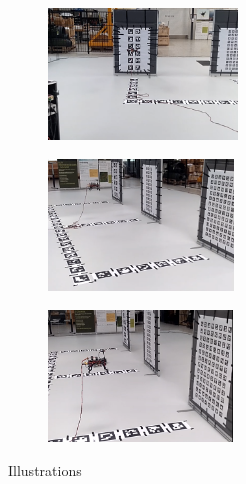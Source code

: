 \documentclass[../Head/report.tex]{subfiles}
\begin{document}
\begin{figure}[H]
    \centering
    \begin{subfigure}[t]{.31\textwidth}
        \centering
        \includegraphics[height=3.5cm]{../Figures/optitrack/hold_pose_using_estimated_aruco_pose_one.png}
        \caption{}
        \label{fig:optitrack_hold_pose_board_one}
    \end{subfigure}
    \begin{subfigure}[t]{.31\textwidth}
        \centering
        \includegraphics[height=3.5cm]{../Figures/optitrack/hold_pose_using_estimated_aruco_pose_two.png}
        \caption{}
        \label{fig:optitrack_hold_pose_board_two}
    \end{subfigure}
    \begin{subfigure}[t]{.31\textwidth}
        \centering
        \includegraphics[height=3.5cm]{../Figures/optitrack/hold_pose_using_estimated_aruco_pose_three.png}
        \caption{}
        \label{fig:optitrack_hold_pose_board_three}
    \end{subfigure}
    \caption{Illustrations}
    \label{fig:optitrack_hold_pose_boards}
\end{figure}
\end{document}
